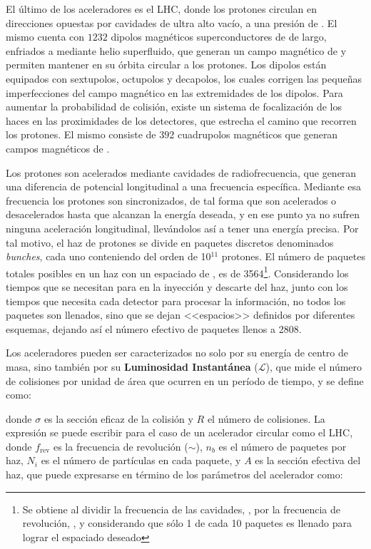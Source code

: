 El último de los aceleradores es el LHC, donde los protones circulan en direcciones opuestas por cavidades de ultra alto vacío, a una presión de . El mismo cuenta con $1232$ dipolos magnéticos superconductores de  de largo, enfriados a  mediante helio superfluido, que generan un campo magnético de  y permiten mantener en su órbita circular a los protones. Los dipolos están equipados con sextupolos, octupolos y decapolos, los cuales corrigen las pequeñas imperfecciones del campo magnético en las extremidades de los dipolos. Para aumentar la probabilidad de colisión, existe un sistema de focalización de los haces en las proximidades de los detectores, que estrecha el camino que recorren los protones. El mismo consiste de $392$ cuadrupolos magnéticos que generan campos magnéticos de .

Los protones son acelerados mediante cavidades de radiofrecuencia, que generan una diferencia de potencial longitudinal a una frecuencia específica. Mediante esa frecuencia los protones son sincronizados, de tal forma que son acelerados o desacelerados hasta que alcanzan la energía deseada, y en ese punto ya no sufren ninguna aceleración longitudinal, llevándolos así a tener una energía precisa. Por tal motivo, el haz de protones se divide en paquetes discretos denominados \textit{bunches}, cada uno conteniendo del orden de 10$^{11}$ protones. El número de paquetes totales posibles en un haz con un espaciado de , es de 3564\footnote{Se obtiene al dividir la frecuencia de las cavidades, , por la frecuencia de revolución, , y considerando que sólo 1 de cada 10 paquetes es llenado para lograr el espaciado deseado}. Considerando los tiempos que se necesitan para en la inyección y descarte del haz, junto con los tiempos que necesita cada detector para procesar la información, no todos los paquetes son llenados, sino que se dejan <<espacios>> definidos por diferentes esquemas, dejando así el número efectivo de paquetes llenos a 2808.

Los aceleradores pueden ser caracterizados no solo por su energía de centro de masa, sino también por su \textbf{Luminosidad Instantánea} ($\mathcal{L}$), que mide el número de colisiones por unidad de área que ocurren en un período de tiempo, y se define como: 



donde $\sigma$ es la sección eficaz de la colisión y $R$ el número de colisiones. La expresión se puede escribir para el caso de un acelerador circular como el LHC, donde $f_{\text{rev}}$ es la frecuencia de revolución ($\sim$), $n_{b}$ es el número de paquetes por haz, $N_{i}$ es el número de partículas en cada paquete, y $A$ es la sección efectiva del haz, que puede expresarse en término de los parámetros del acelerador como:



